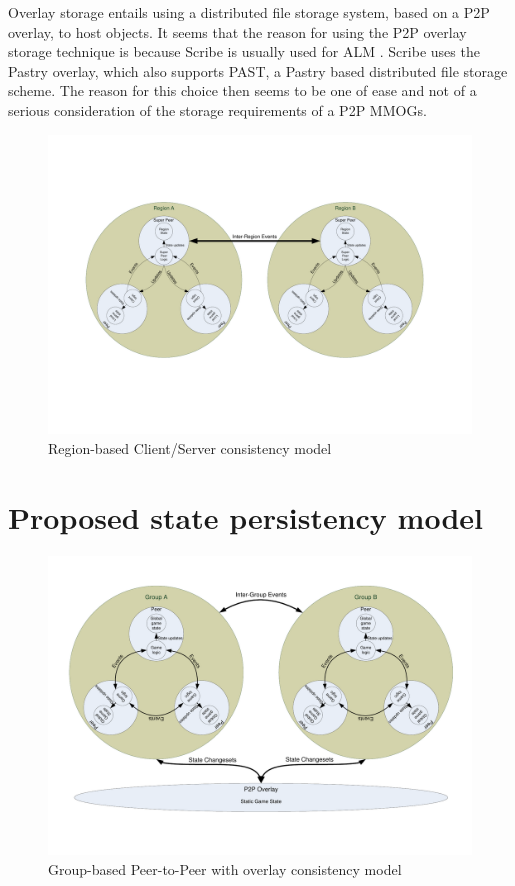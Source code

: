 \documentclass[journal,oneside,a4paper,onecolumn]{IEEEtran}
\begin{document}
Overlay storage entails using a distributed file storage system, based on a P2P overlay, to host objects. It seems that the reason for using the P2P overlay storage technique is because Scribe is usually used for \ac{ALM} \cite{}. Scribe uses the Pastry overlay, which also supports PAST, a Pastry based distributed file storage scheme. The reason for this choice then seems to be one of ease and not of a serious consideration of the storage requirements of a P2P MMOGs.

\begin{figure}[htbp]
 \centering
 \includegraphics[clip=true, viewport=2cm 5cm 27cm 16.5cm, width=\columnwidth]{region_based_CS_CM}
 \caption{Region-based Client/Server consistency model}
 \label{fig_cs_region_cm}
\end{figure}

\section{Proposed state persistency model}
\label{proposed_persistency}

\begin{figure}[htbp]
 \centering
 \includegraphics[clip=true, viewport= 1cm 3cm 28.5cm 19cm, width=\columnwidth]{group_based_P2P_P2PO}
 \caption{Group-based Peer-to-Peer with overlay consistency model}
 \label{fig_p2p_group_o_cm}
\end{figure}
\end{document}
